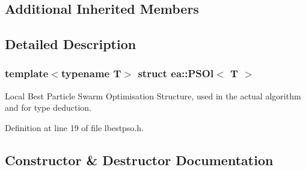 \subsection*{Additional Inherited Members}


\subsection{Detailed Description}
\subsubsection*{template$<$typename T$>$\newline
struct ea\+::\+P\+S\+Ol$<$ T $>$}

Local Best Particle Swarm Optimisation Structure, used in the actual algorithm and for type deduction. 

Definition at line 19 of file lbestpso.\+h.



\subsection{Constructor \& Destructor Documentation}
\mbox{\label{structea_1_1_p_s_ol_ab0374356be7c06c8aae9092970f3525e}} 
